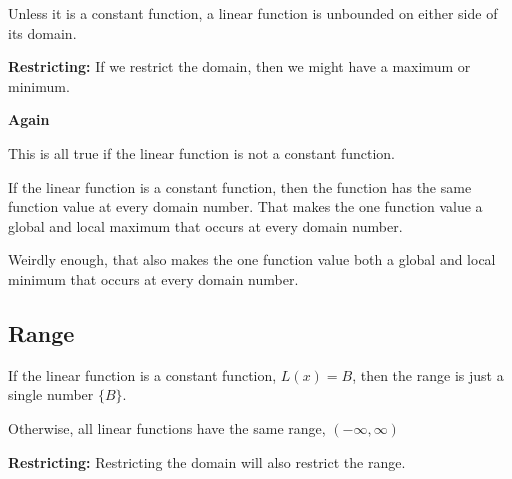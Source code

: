 \documentclass{ximera}
\begin{document}
Unless it is a constant function, a linear function is unbounded on either side of its domain.

\textbf{Restricting:} If we restrict the domain, then we might have a maximum or minimum. 



\begin{warning} \textbf{\textcolor{red!70!black}{Again}} 

This is all true if the linear function is not a constant function. 


If the linear function is a constant function, then the function has the same function value at every domain number.  That makes the one function value a global and local maximum that occurs at every domain number. 

Weirdly enough, that also makes the one function value both a global and local minimum that occurs at every domain number.

\end{warning}



\subsection*{Range}


If the linear function is a constant function, $L(x) = B$, then the range is just a single number $\{ B \}$. 

Otherwise, all linear functions have the same range, $(-\infty, \infty)$ 

\textbf{Restricting:} Restricting the domain will also restrict the range.
\end{document}
